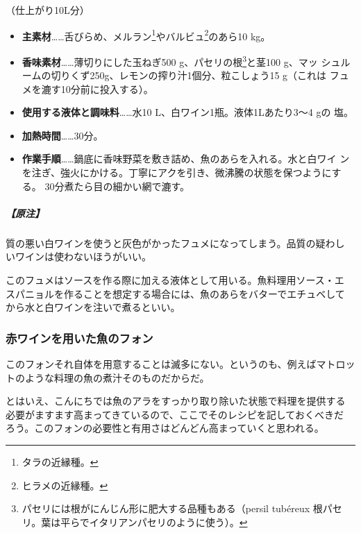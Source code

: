 \begin{recette}
（仕上がり10L分）

\begin{itemize}
\item
  \textbf{主素材}\ldots{}\ldots{}舌びらめ、メルラン\footnote{タラの近縁種。}やバルビュ\footnote{ヒラメの近縁種。}のあら10
  kg。
\item
  \textbf{香味素材}\ldots{}\ldots{}薄切りにした玉ねぎ500
  g、パセリの根\footnote{パセリには根がにんじん形に肥大する品種もある（persil
    tubéreux 根パセリ。葉は平らでイタリアンパセリのように使う）。}と茎100
  g、マッ シュルームの切りくず250g、レモンの搾り汁1個分、粒こしょう15
  g（これは フュメを漉す10分前に投入する）。
\item
  \textbf{使用する液体と調味料}\ldots{}\ldots{}水10
  L、白ワイン1瓶。液体1Lあたり3〜4 gの 塩。
\item
  \textbf{加熱時間}\ldots{}\ldots{}30分。
\item
  \textbf{作業手順}\ldots{}\ldots{}鍋底に香味野菜を敷き詰め、魚のあらを入れる。水と白ワイ
  ンを注ぎ、強火にかける。丁寧にアクを引き、微沸騰の状態を保つようにする。
  30分煮たら目の細かい網で漉す。
\end{itemize}

\hypertarget{nota-fumet-de-poisson}{%
\subparagraph{【原注】}\label{nota-fumet-de-poisson}}

質の悪い白ワインを使うと灰色がかったフュメになってしまう。品質の疑わし
いワインは使わないほうがいい。

このフュメはソースを作る際に加える液体として用いる。魚料理用ソース・エ
スパニョルを作ることを想定する場合には、魚のあらをバターでエチュベして
から水と白ワインを注いで煮るといい。

\hypertarget{fonds-de-poisson-au-vin-rouge}{%
\subsubsection{赤ワインを用いた魚のフォン}\label{fonds-de-poisson-au-vin-rouge}}



このフォンそれ自体を用意することは滅多にない。というのも、例えばマトロッ
トのような料理の魚の煮汁そのものだからだ。

とはいえ、こんにちでは魚のアラをすっかり取り除いた状態で料理を提供する
必要がますます高まってきているので、ここでそのレシピを記しておくべきだ
ろう。このフォンの必要性と有用さはどんどん高まっていくと思われる。


\end{recette}
